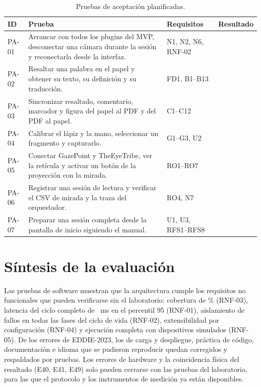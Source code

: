 \begin{table}[H]
\centering
\caption{Pruebas de aceptación planificadas.}
\label{tab:aceptacion}
\footnotesize
\begin{tabularx}{\textwidth}{l >{\raggedright\arraybackslash}X >{\raggedright\arraybackslash}p{3.2cm} c}
\toprule
\textbf{ID} & \textbf{Prueba} & \textbf{Requisitos} & \textbf{Resultado} \\ \midrule
PA-01 & Arrancar con todos los plugins del MVP, desconectar una cámara durante la sesión y reconectarla desde la interfaz. & N1, N2, N6, RNF-02 & \pendiente{} \\
PA-02 & Resaltar una palabra en el papel y obtener su texto, su definición y su traducción. & FD1, B1--B13 & \pendiente{} \\
PA-03 & Sincronizar resaltado, comentario, marcador y figura del papel al PDF y del PDF al papel. & C1--C12 & \pendiente{} \\
PA-04 & Calibrar el lápiz y la mano, seleccionar un fragmento y capturarlo. & G1--G3, U2 & \pendiente{} \\
PA-05 & Conectar GazePoint y TheEyeTribe, ver la retícula y activar un botón de la proyección con la mirada. & RO1--RO7 & \pendiente{} \\
PA-06 & Registrar una sesión de lectura y verificar el CSV de mirada y la traza del orquestador. & RO4, N7 & \pendiente{} \\
PA-07 & Preparar una sesión completa desde la pantalla de inicio siguiendo el manual. & U1, U3, RFS1--RFS8 & \pendiente{} \\ \bottomrule
\end{tabularx}
\end{table}

\section{Síntesis de la evaluación}

Las pruebas de software muestran que la arquitectura cumple los requisitos no funcionales que pueden verificarse sin el laboratorio: cobertura de \PSieteCobertura\% (RNF-03), latencia del ciclo completo de \PSieteCicloPnoventaycinco~ms en el percentil 95 (RNF-01), aislamiento de fallos en todas las fases del ciclo de vida (RNF-02), extensibilidad por configuración (RNF-04) y ejecución completa con dispositivos simulados (RNF-05). De los errores de EDDIE-2023, los de carga y despliegue, práctica de código, documentación e idioma que se pudieron reproducir quedan corregidos y respaldados por pruebas. Los errores de hardware y la coincidencia física del resaltado (E40, E41, E49) solo pueden cerrarse con las pruebas del laboratorio, para las que el protocolo y los instrumentos de medición ya están disponibles.
